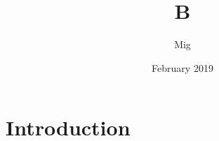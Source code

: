 \documentclass{article}
\title{B}
\author{Mig }
\date{February 2019}
\begin{document}
\maketitle

\section{Introduction}
\end{document}
